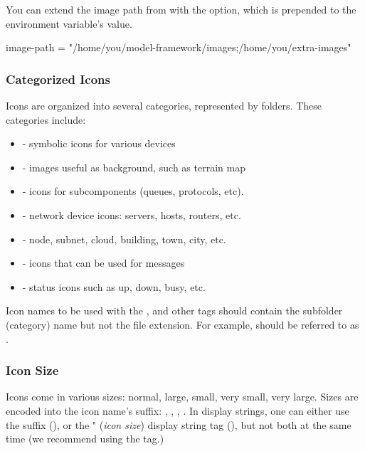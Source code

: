 You can extend the image path from  with the
 option, which is prepended to the environment
variable's value.

\begin{inifile}
[General]
image-path = "/home/you/model-framework/images;/home/you/extra-images"
\end{inifile}


\subsubsection{Categorized Icons}

Icons are organized into several categories, represented by folders.
These categories include:

\begin{itemize}
  \item {} - symbolic icons for various devices
  \item {} - images useful as background, such as terrain map
  \item {} - icons for subcomponents (queues, protocols, etc).
  \item {} - network device icons: servers, hosts, routers, etc.
  \item {} - node, subnet, cloud, building, town, city, etc.
  \item {} - icons that can be used for messages
  \item {} - status icons such as up, down, busy, etc.
\end{itemize}

Icon names to be used with the ,  and other tags should
contain the subfolder (category) name but not the file extension. For
example,  should be referred to as
.


\subsubsection{Icon Size}

Icons come in various sizes: normal, large, small, very small, very large.
Sizes are encoded into the icon name's suffix: , ,
, . In display strings, one can either use the suffix
(), or the " (\textit{icon size})
display string tag (), but not both at the same
time (we recommend using the  tag.)

